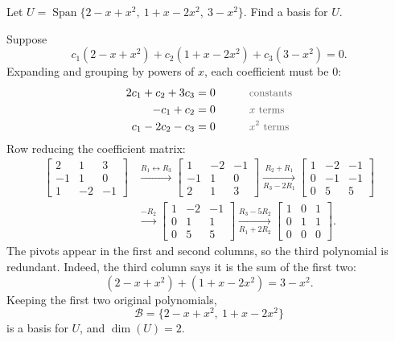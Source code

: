 \begin{example}
Let $U = \operatorname{Span}\{2 - x + x^2, \ 1 + x - 2x^2, \ 3 - x^2\}$. Find a basis for $U$.

\begin{solution}
Suppose
\[
c_1(2 - x + x^2) + c_2(1 + x - 2x^2) + c_3(3 - x^2) = 0.
\]
Expanding and grouping by powers of $x$, each coefficient must be $0$:
\begin{alignat*}{2}
2c_1 + c_2 + 3c_3 &= 0 &\qquad& \by{constants} \\
-c_1 + c_2 &= 0 && \by{$x$ terms} \\
c_1 - 2c_2 - c_3 &= 0 && \by{$x^2$ terms}
\end{alignat*}
Row reducing the coefficient matrix:
\begin{align*}
\begin{bmatrix}
 2 &  1 &  3 \\
-1 &  1 &  0 \\
 1 & -2 & -1
\end{bmatrix}
&\xrightarrow{R_1 \leftrightarrow R_3}
\begin{bmatrix}
 1 & -2 & -1 \\
-1 &  1 &  0 \\
 2 &  1 &  3
\end{bmatrix}
\xrightarrow[R_3 - 2R_1]{R_2 + R_1}
\begin{bmatrix}
 1 & -2 & -1 \\
 0 & -1 & -1 \\
 0 &  5 &  5
\end{bmatrix} \\[0.8em]
&\xrightarrow{-R_2}
\begin{bmatrix}
 1 & -2 & -1 \\
 0 &  1 &  1 \\
 0 &  5 &  5
\end{bmatrix}
\xrightarrow[R_1 + 2R_2]{R_3 - 5R_2}
\begin{bmatrix}
 1 & 0 & 1 \\
 0 & 1 & 1 \\
 0 & 0 & 0
\end{bmatrix}.
\end{align*}
The pivots appear in the first and second columns, so the third polynomial is redundant. Indeed, the third column says it is the sum of the first two:
\[
(2 - x + x^2) + (1 + x - 2x^2) = 3 - x^2.
\]
Keeping the first two original polynomials,
\[
\mathcal{B} = \{2 - x + x^2, \ 1 + x - 2x^2\}
\]
is a basis for $U$, and $\dim(U) = 2$.
\end{solution}
\end{example}

